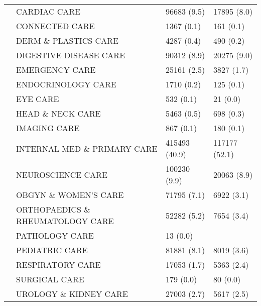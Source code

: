 \begin{tabular}{llll}
                                       & CARDIAC CARE &              96683 (9.5) &       17895 (8.0) \\
                                       & CONNECTED CARE &               1367 (0.1) &         161 (0.1) \\
                                       & DERM \& PLASTICS CARE &               4287 (0.4) &         490 (0.2) \\
                                       & DIGESTIVE DISEASE CARE &              90312 (8.9) &       20275 (9.0) \\
                                       & EMERGENCY CARE &              25161 (2.5) &        3827 (1.7) \\
                                       & ENDOCRINOLOGY CARE &               1710 (0.2) &         125 (0.1) \\
                                       & EYE CARE &                532 (0.1) &          21 (0.0) \\
                                       & HEAD \& NECK CARE &               5463 (0.5) &         698 (0.3) \\
                                       & IMAGING CARE &                867 (0.1) &         180 (0.1) \\
                                       & INTERNAL MED \& PRIMARY CARE &            415493 (40.9) &     117177 (52.1) \\
                                       & NEUROSCIENCE CARE &             100230 (9.9) &       20063 (8.9) \\
                                       & OBGYN \& WOMEN'S CARE &              71795 (7.1) &        6922 (3.1) \\
                                       & ORTHOPAEDICS \& RHEUMATOLOGY CARE &              52282 (5.2) &        7654 (3.4) \\
                                       & PATHOLOGY CARE &                 13 (0.0) &                   \\
                                       & PEDIATRIC CARE &              81881 (8.1) &        8019 (3.6) \\
                                       & RESPIRATORY CARE &              17053 (1.7) &        5363 (2.4) \\
                                       & SURGICAL CARE &                179 (0.0) &          80 (0.0) \\
                                       & UROLOGY \& KIDNEY CARE &              27003 (2.7) &        5617 (2.5) \\

\end{tabular}
